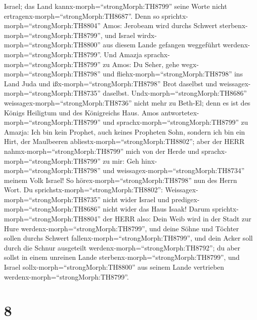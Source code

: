 Israel; das Land kannx-morph=``strongMorph:TH8799'' seine Worte nicht
ertragenx-morph=``strongMorph:TH8687''.  Denn so
sprichtx-morph=``strongMorph:TH8804'' Amos: Jerobeam wird durchs Schwert
sterbenx-morph=``strongMorph:TH8799'', und Israel
wirdx-morph=``strongMorph:TH8800'' aus diesem Lande gefangen weggeführt
werdenx-morph=``strongMorph:TH8799''.  Und Amazja
sprachx-morph=``strongMorph:TH8799'' zu Amos: Du Seher, gehe
wegx-morph=``strongMorph:TH8798'' und
fliehx-morph=``strongMorph:TH8798'' ins Land Juda und
ißx-morph=``strongMorph:TH8798'' Brot daselbst und
weissagex-morph=``strongMorph:TH8735'' daselbst. 
Undx-morph=``strongMorph:TH8686'' weissagex-morph=``strongMorph:TH8736''
nicht mehr zu Beth-El; denn es ist des Königs Heiligtum und des
Königreichs Haus.  Amos
antwortetex-morph=``strongMorph:TH8799'' und
sprachx-morph=``strongMorph:TH8799'' zu Amazja: Ich bin kein Prophet,
auch keines Propheten Sohn, sondern ich bin ein Hirt, der Maulbeeren
abliestx-morph=``strongMorph:TH8802'';  aber der HERR
nahmx-morph=``strongMorph:TH8799'' mich von der Herde und
sprachx-morph=``strongMorph:TH8799'' zu mir: Geh
hinx-morph=``strongMorph:TH8798'' und
weissagex-morph=``strongMorph:TH8734'' meinem Volk Israel! 
So hörex-morph=``strongMorph:TH8798'' nun des Herrn Wort. Du
sprichstx-morph=``strongMorph:TH8802'':
Weissagex-morph=``strongMorph:TH8735'' nicht wider Israel und
predigex-morph=``strongMorph:TH8686'' nicht wider das Haus Isaak!
 Darum sprichtx-morph=``strongMorph:TH8804'' der HERR also:
Dein Weib wird in der Stadt zur Hure
werdenx-morph=``strongMorph:TH8799'', und deine Söhne und Töchter sollen
durchs Schwert fallenx-morph=``strongMorph:TH8799'', und dein Acker soll
durch die Schnur ausgeteilt werdenx-morph=``strongMorph:TH8792''; du
aber sollst in einem unreinen Lande
sterbenx-morph=``strongMorph:TH8799'', und Israel
sollx-morph=``strongMorph:TH8800'' aus seinem Lande vertrieben
werdenx-morph=``strongMorph:TH8799''.

\hypertarget{section-7}{%
\section{8}\label{section-7}}

